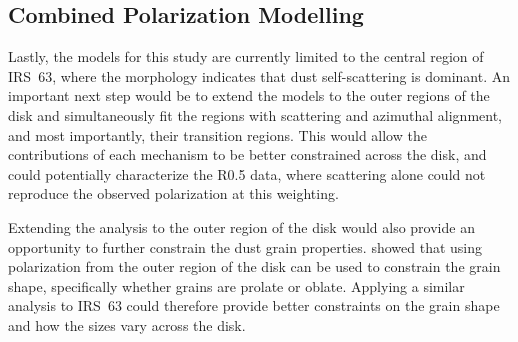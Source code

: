 


\subsection{Combined Polarization Modelling}
Lastly, the models for this study are currently limited to the central region of IRS~63, where the morphology indicates that dust self-scattering is dominant. An important next step would be to extend the models to the outer regions of the disk and simultaneously fit the regions with scattering and azimuthal alignment, and most importantly, their transition regions. This would allow the contributions of each mechanism to be better constrained across the disk, and could potentially characterize the \bfive R0.5 data, where scattering alone could not reproduce the observed polarization at this weighting. 


Extending the analysis to the outer region of the disk would also provide an opportunity to further constrain the dust grain properties. \cite{Lin2024} showed that using polarization from the outer region of the disk can be used to constrain the grain shape, specifically whether grains are prolate or oblate. Applying a similar analysis to IRS~63 could therefore provide better constraints on the grain shape and how the sizes vary across the disk. 










